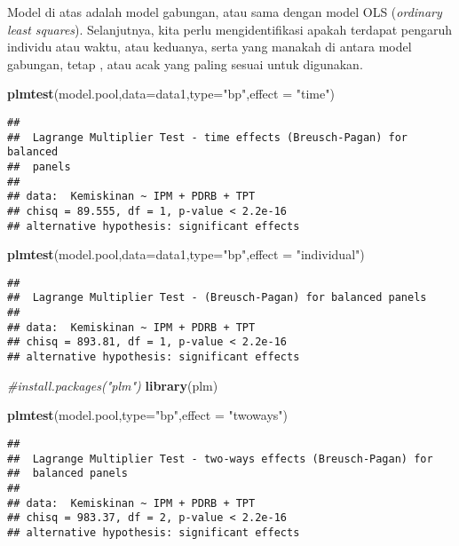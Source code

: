 \documentclass[
]{book}
\newenvironment{Shaded}{\begin{snugshade}}{\end{snugshade}}
\newcommand{\CommentTok}[1]{\textcolor[rgb]{0.56,0.35,0.01}{\textit{#1}}}
\newcommand{\DataTypeTok}[1]{\textcolor[rgb]{0.13,0.29,0.53}{#1}}
\newcommand{\KeywordTok}[1]{\textcolor[rgb]{0.13,0.29,0.53}{\textbf{#1}}}
\newcommand{\NormalTok}[1]{#1}
\newcommand{\StringTok}[1]{\textcolor[rgb]{0.31,0.60,0.02}{#1}}
\begin{document}
Model di atas adalah model gabungan, atau sama dengan model OLS (\emph{ordinary least squares}). Selanjutnya, kita perlu mengidentifikasi apakah terdapat pengaruh individu atau waktu, atau keduanya, serta yang manakah di antara model gabungan, tetap , atau acak yang paling sesuai untuk digunakan.

\begin{Shaded}
\begin{Highlighting}[]
\KeywordTok{plmtest}\NormalTok{(model.pool,}\DataTypeTok{data=}\NormalTok{data1,}\DataTypeTok{type=}\StringTok{"bp"}\NormalTok{,}\DataTypeTok{effect =} \StringTok{"time"}\NormalTok{)}
\end{Highlighting}
\end{Shaded}

\begin{verbatim}
## 
##  Lagrange Multiplier Test - time effects (Breusch-Pagan) for balanced
##  panels
## 
## data:  Kemiskinan ~ IPM + PDRB + TPT
## chisq = 89.555, df = 1, p-value < 2.2e-16
## alternative hypothesis: significant effects
\end{verbatim}

\begin{Shaded}
\begin{Highlighting}[]
\KeywordTok{plmtest}\NormalTok{(model.pool,}\DataTypeTok{data=}\NormalTok{data1,}\DataTypeTok{type=}\StringTok{"bp"}\NormalTok{,}\DataTypeTok{effect =} \StringTok{"individual"}\NormalTok{)}
\end{Highlighting}
\end{Shaded}

\begin{verbatim}
## 
##  Lagrange Multiplier Test - (Breusch-Pagan) for balanced panels
## 
## data:  Kemiskinan ~ IPM + PDRB + TPT
## chisq = 893.81, df = 1, p-value < 2.2e-16
## alternative hypothesis: significant effects
\end{verbatim}

\begin{Shaded}
\begin{Highlighting}[]
\CommentTok{\#install.packages("plm")}
\KeywordTok{library}\NormalTok{(plm)}

\KeywordTok{plmtest}\NormalTok{(model.pool,}\DataTypeTok{type=}\StringTok{"bp"}\NormalTok{,}\DataTypeTok{effect =} \StringTok{"twoways"}\NormalTok{)}
\end{Highlighting}
\end{Shaded}

\begin{verbatim}
## 
##  Lagrange Multiplier Test - two-ways effects (Breusch-Pagan) for
##  balanced panels
## 
## data:  Kemiskinan ~ IPM + PDRB + TPT
## chisq = 983.37, df = 2, p-value < 2.2e-16
## alternative hypothesis: significant effects
\end{verbatim}
\end{document}
